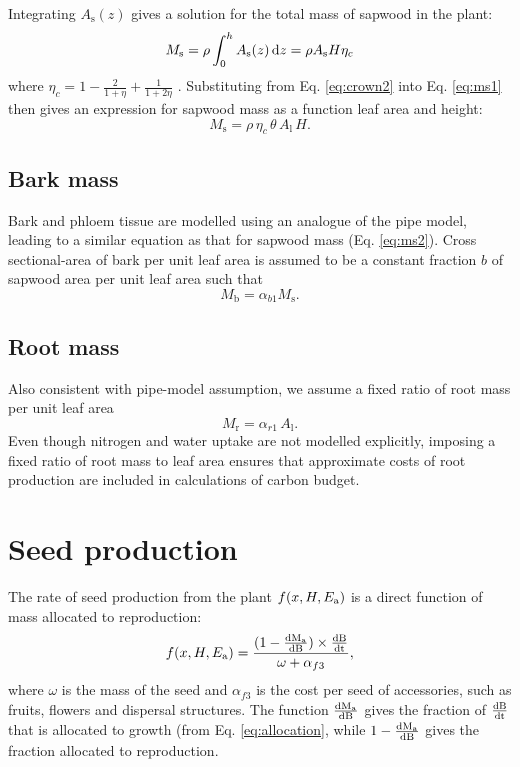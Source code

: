 \documentclass[10pt,twoside]{article}
\begin{document}
Integrating \(A_\textrm{s}(z)\) gives a solution for the total mass of
sapwood in the plant:
\begin{equation}\label{eq:ms1}
M_\textrm{s} = \rho \int_0^h  A_\textrm{s}(z) \, {\rm d}z = \rho  A_\textrm{s} H \eta_c
\end{equation}
where \(\eta_c = 1 - \frac{2}{1 + \eta} + \frac{1}{1 + 2\eta}\)
\citep{Yokozawa-1995}. Substituting from Eq. \ref{eq:crown2} into Eq.
\ref{eq:ms1} then gives an expression for sapwood mass as a function
leaf area and height:
\begin{equation}\label{eq:ms2}
M_\textrm{s} = \rho \, \eta_c \, \theta \, A_\textrm{l} \, H.
\end{equation}

\subsection{Bark mass}\label{bark-mass}

Bark and phloem tissue are modelled using an analogue of the pipe model,
leading to a similar equation as that for sapwood mass (Eq.
\ref{eq:ms2}). Cross sectional-area of bark per unit leaf area is
assumed to be a constant fraction \(b\) of sapwood area per unit leaf
area such that
\begin{equation}\label{eq:mb}
M_\textrm{b} = \alpha_{b1} M_\textrm{s}.
\end{equation}

\subsection{Root mass}\label{root-mass}

Also consistent with pipe-model assumption, we assume a fixed ratio of
root mass per unit leaf area
\begin{equation}\label{eq:mr}
M_\textrm{r} = \alpha_{r1} \, A_\textrm{l}.
\end{equation}
Even though nitrogen and water uptake are not modelled explicitly,
imposing a fixed ratio of root mass to leaf area ensures that
approximate costs of root production are included in calculations of
carbon budget.

\section{Seed production}\label{seed-production}

The rate of seed production from the plant \(f(x, H, E_{\rm a})\) is a direct
function of mass allocated to reproduction:
\begin{equation}\label{eq:fecundity}
f(x, H, E_{\rm a}) = \frac{(1 - \frac{\rm{d}M_\textrm{a}}{\rm{d}B}) \times \frac{\rm{d}B}{\rm{d}t}}{
  \omega + \alpha_{f3}},
\end{equation}
where \(\omega\) is the mass of the seed and \(\alpha_{f3}\) is the cost
per seed of accessories, such as fruits, flowers and dispersal
structures. The function $\frac{\rm{d}M_\textrm{a}}{\rm{d}B}$ gives the fraction
of $\frac{\rm{d}B}{\rm{d}t}$ that is allocated to growth (from Eq. \ref{eq:allocation}, while
$1-\frac{\rm{d}M_\textrm{a}}{\rm{d}B}$ gives the fraction allocated
to reproduction.
\end{document}
